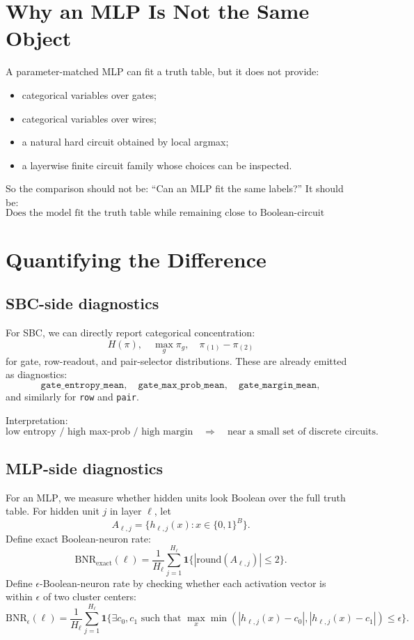 \documentclass[11pt]{article}
\newcommand{\SBC}{\textsc{SBC}}
\newcommand{\MLP}{\textsc{MLP}}
\newcommand{\BNR}{\mathrm{BNR}}
\begin{document}
\section{Why an MLP Is Not the Same Object}

A parameter-matched \MLP{} can fit a truth table, but it does not provide:
\begin{itemize}[leftmargin=1.5em]
  \item categorical variables over gates;
  \item categorical variables over wires;
  \item a natural hard circuit obtained by local argmax;
  \item a layerwise finite circuit family whose choices can be inspected.
\end{itemize}

So the comparison should not be: ``Can an \MLP{} fit the same labels?''  It should be:
\[
  \text{Does the model fit the truth table while remaining close to Boolean-circuit semantics?}
\]

\section{Quantifying the Difference}

\subsection{SBC-side diagnostics}

For \SBC{}, we can directly report categorical concentration:
\[
  H(\pi),\quad \max_g \pi_g,\quad
  \pi_{(1)}-\pi_{(2)}
\]
for gate, row-readout, and pair-selector distributions.  These are already emitted as diagnostics:
\[
  \texttt{gate\_entropy\_mean},\quad
  \texttt{gate\_max\_prob\_mean},\quad
  \texttt{gate\_margin\_mean},
\]
and similarly for \texttt{row} and \texttt{pair}.

Interpretation:
\[
  \text{low entropy / high max-prob / high margin}
  \quad\Rightarrow\quad
  \text{near a small set of discrete circuits}.
\]

\subsection{MLP-side diagnostics}

For an \MLP{}, we measure whether hidden units look Boolean over the full truth table.  For hidden unit \(j\) in layer \(\ell\), let
\[
  A_{\ell,j} = \{ h_{\ell,j}(x) : x \in \{0,1\}^B \}.
\]
Define exact Boolean-neuron rate:
\[
  \BNR_{\mathrm{exact}}(\ell)
  =
  \frac{1}{H_\ell}
  \sum_{j=1}^{H_\ell}
  \mathbf{1}\{ |\mathrm{round}(A_{\ell,j})| \le 2 \}.
\]
Define \(\epsilon\)-Boolean-neuron rate by checking whether each activation vector is within \(\epsilon\) of two cluster centers:
\[
  \BNR_{\epsilon}(\ell)
  =
  \frac{1}{H_\ell}
  \sum_{j=1}^{H_\ell}
  \mathbf{1}\{
    \exists c_0,c_1
    \text{ such that }
    \max_x \min(|h_{\ell,j}(x)-c_0|, |h_{\ell,j}(x)-c_1|)
    \le \epsilon
  \}.
\]
\end{document}
